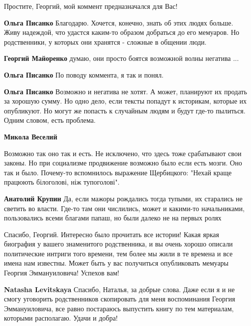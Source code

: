 \begin{itemize}
\begin{itemize}
\begin{itemize} %
Простите, Георгий, мой коммент предназначался для Вас!

\textbf{Ольга Писанко} Благодарю. Хочется, конечно, знать об этих людях больше. Живу надеждой, что удастся каким-то образом добраться до его мемуаров. Но родственники, у которых они хранятся - сложные в общении люди.

\textbf{Георгий Майоренко} думаю, они просто боятся возможной волны негатива ...

\textbf{Ольга Писанко} По поводу коммента, я так и понял.

\textbf{Ольга Писанко} Возможно и негатива не хотят. А может, планируют их продать за хорошую сумму. Но одно дело, если тексты попадут к историкам, которые их опубликуют. Но могут же попасть к случайным людям и будут где-то пылиться. Одним словом, есть проблема.
\end{itemize} %

\textbf{Микола Веселий} 

Возможно так оно так и есть. Не исключено, что здесь тоже срабатывают свои
законы. Но при социализме продвижение возможно было если есть мозги. Оно так и
было. Почему-то вспомнилось выражение Щербицкого: "Нехай краще працюють
білоголові, ніж тупоголові".

\begin{itemize} %
\textbf{Анатолий Крупин} Да, если мажоры рождались тогда тупыми, их старались не светить во власти. Где-то там они числились, может и какими-то начальниками, пользовались всеми благами папаш, но были далеко не на первых ролях
\end{itemize} %

\end{itemize} %


Спасибо, Георгий. Интересно было прочитать все истории! Какая яркая биография у
вашего знаменитого родственника, и вы очень хорошо описали политические интриги
того времени, тем более мы жили в те времена и все имена нам известны. Может
быть у вас получиться опубликовать мемуары Георгия Эммануиловича! Успехов вам!

\begin{itemize} %
\textbf{Natasha Levitskaya} Спасибо, Наталья, за добрые слова. Даже если я и не смогу уговорить родственников скопировать для меня воспоминания Георгия Эммануиловича, все равно постараюсь выпустить книгу по тем материалам, которыми располагаю. Удачи и добра!


\end{itemize}
\end{itemize}
